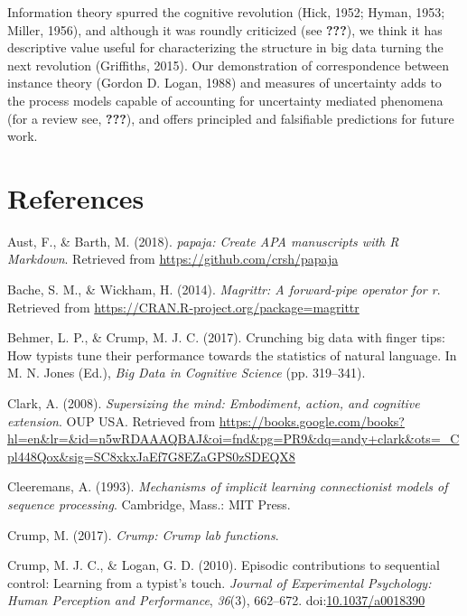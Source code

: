 \documentclass[floatsintext,man]{apa6}
\theoremstyle{definition}
\theoremstyle{definition}
\theoremstyle{definition}
\theoremstyle{remark}
\begin{document}
Information theory spurred the cognitive revolution (Hick, 1952; Hyman,
1953; Miller, 1956), and although it was roundly criticized (see
{\textbf{???}}), we think it has descriptive value useful for
characterizing the structure in big data turning the next revolution
(Griffiths, 2015). Our demonstration of correspondence between instance
theory (Gordon D. Logan, 1988) and measures of uncertainty adds to the
process models capable of accounting for uncertainty mediated phenomena
(for a review see, {\textbf{???}}), and offers principled and
falsifiable predictions for future work.

\newpage

\section{References}\label{references}

\begingroup
\setlength{\parindent}{-0.5in} \setlength{\leftskip}{0.5in}

\hypertarget{refs}{}
\hypertarget{ref-R-papaja}{}
Aust, F., \& Barth, M. (2018). \emph{papaja: Create APA manuscripts with
R Markdown}. Retrieved from \url{https://github.com/crsh/papaja}

\hypertarget{ref-R-magrittr}{}
Bache, S. M., \& Wickham, H. (2014). \emph{Magrittr: A forward-pipe
operator for r}. Retrieved from
\url{https://CRAN.R-project.org/package=magrittr}

\hypertarget{ref-behmer_crunching_2017}{}
Behmer, L. P., \& Crump, M. J. C. (2017). Crunching big data with finger
tips: How typists tune their performance towards the statistics of
natural language. In M. N. Jones (Ed.), \emph{Big Data in Cognitive
Science} (pp. 319--341).

\hypertarget{ref-clark_supersizing_2008}{}
Clark, A. (2008). \emph{Supersizing the mind: Embodiment, action, and
cognitive extension}. OUP USA. Retrieved from
\url{https://books.google.com/books?hl=en\&lr=\&id=n5wRDAAAQBAJ\&oi=fnd\&pg=PR9\&dq=andy+clark\&ots=_Cpl448Qox\&sig=SC8xkxJaEf7G8EZaGPS0zSDEQX8}

\hypertarget{ref-cleeremans_mechanisms_1993}{}
Cleeremans, A. (1993). \emph{Mechanisms of implicit learning
connectionist models of sequence processing}. Cambridge, Mass.: MIT
Press.

\hypertarget{ref-R-Crump}{}
Crump, M. (2017). \emph{Crump: Crump lab functions}.

\hypertarget{ref-crump_episodic_2010}{}
Crump, M. J. C., \& Logan, G. D. (2010). Episodic contributions to
sequential control: Learning from a typist's touch. \emph{Journal of
Experimental Psychology: Human Perception and Performance},
\emph{36}(3), 662--672.
doi:\href{https://doi.org/10.1037/a0018390}{10.1037/a0018390}
\end{document}
